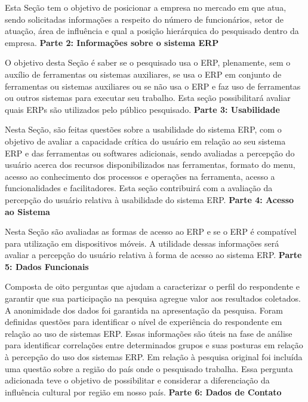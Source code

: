 \indent Esta Seção tem o objetivo de posicionar a empresa no mercado em que atua, sendo solicitadas informações a respeito do número de funcionários, setor de atuação, área de influência e qual a posição hierárquica do pesquisado dentro da empresa.\newline 
\newline
\noindent \textbf{Parte 2: Informações sobre o sistema ERP} \newline

\indent O objetivo desta Seção é saber se o pesquisado usa o ERP, plenamente, sem o auxílio de ferramentas ou sistemas auxiliares, se usa o ERP em conjunto de ferramentas ou sistemas auxiliares ou se não usa o ERP e faz uso de ferramentas ou outros sistemas para executar seu trabalho. Esta seção possibilitará avaliar quais ERPs são utilizados pelo público pesquisado.\newline 
\newline
\noindent \textbf{Parte 3: Usabilidade} \newline

\indent Nesta Seção, são feitas questões sobre a usabilidade do sistema ERP, com o objetivo de avaliar a capacidade crítica do usuário em relação ao seu sistema ERP e das ferramentas ou softwares adicionais, sendo avaliadas a percepção do usuário acerca dos recursos disponibilizados nas ferramentas, formato do menu, acesso ao conhecimento dos processos e operações na ferramenta, acesso a funcionalidades e facilitadores. Esta seção contribuirá com a avaliação da percepção do usuário relativa à usabilidade do sistema ERP.\newline 
\newline
\noindent \textbf{Parte 4: Acesso ao Sistema} \newline

\indent Nesta Seção são avaliadas as formas de acesso ao ERP e se o ERP é compatível para utilização em dispositivos móveis. A utilidade dessas informações será avaliar a percepção do usuário relativa à forma de acesso ao sistema ERP.\newline 
\newline
\noindent \textbf{Parte 5: Dados Funcionais} \newline

\indent Composta de oito perguntas que ajudam a caracterizar o perfil do respondente e garantir que sua participação na pesquisa agregue valor aos resultados coletados. A anonimidade dos dados foi garantida na apresentação da pesquisa. Foram definidas questões para identificar o nível de experiência do respondente em relação ao uso de sistemas ERP. \newline 
\indent Essas informações são úteis na fase de análise para identificar correlações entre determinados grupos e suas posturas em relação à percepção do uso dos sistemas ERP. Em relação à pesquisa original foi incluída uma questão sobre a região do país onde o pesquisado trabalha. Essa pergunta adicionada teve o objetivo de possibilitar e considerar a diferenciação da influência cultural por região em nosso país.\newline 
\newline
\noindent \textbf{Parte 6: Dados de Contato} \newline

